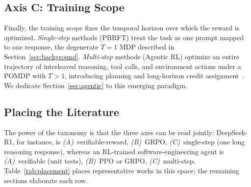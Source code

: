\subsection{Axis C: Training Scope}

Finally, the training scope fixes the temporal horizon over which the
reward is optimized. \emph{Single-step} methods (PBRFT) treat the task
as one prompt mapped to one response, the degenerate $T{=}1$ MDP
described in Section~\ref{sec:background}. \emph{Multi-step} methods
(Agentic RL) optimize an entire trajectory of interleaved reasoning,
tool calls, and environment actions under a POMDP with $T{>}1$,
introducing planning and long-horizon credit
assignment~\cite{zhang2026landscape}. We dedicate
Section~\ref{sec:agentic} to this emerging paradigm.

\subsection{Placing the Literature}

The power of the taxonomy is that the three axes can be read jointly:
DeepSeek-R1, for instance, is \emph{(A)}~verifiable-reward,
\emph{(B)}~GRPO, \emph{(C)}~single-step (one long reasoning response),
whereas an RL-trained software-engineering agent is
\emph{(A)}~verifiable (unit tests), \emph{(B)}~PPO or GRPO,
\emph{(C)}~multi-step.
Table~\ref{tab:placement} places representative works in this space; the
remaining sections elaborate each row.

